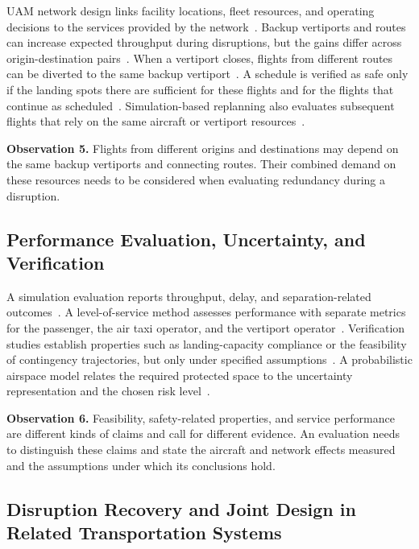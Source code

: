 \documentclass[11pt,letterpaper]{article}
\newcommand{\observation}[2]{\par\noindent\textbf{Observation #1.} #2\par}
\begin{document}
UAM network design links facility locations, fleet resources, and operating decisions to the services provided by the network~\cite{Wang2025_L087}. Backup vertiports and routes can increase expected throughput during disruptions, but the gains differ across origin-destination pairs~\cite{Wei2024_L063}. When a vertiport closes, flights from different routes can be diverted to the same backup vertiport~\cite{Wei2024_L069}. A schedule is verified as safe only if the landing spots there are sufficient for these flights and for the flights that continue as scheduled~\cite{Wei2024_L069}. Simulation-based replanning also evaluates subsequent flights that rely on the same aircraft or vertiport resources~\cite{Prince2025_L041}.

\observation{5}{Flights from different origins and destinations may depend on the same backup vertiports and connecting routes. Their combined demand on these resources needs to be considered when evaluating redundancy during a disruption.}

\subsection{Performance Evaluation, Uncertainty, and Verification}
\label{sec:literature-6}

A simulation evaluation reports throughput, delay, and separation-related outcomes~\cite{Prince2025_L041}. A level-of-service method assesses performance with separate metrics for the passenger, the air taxi operator, and the vertiport operator~\cite{Schweiger2023_L090}. Verification studies establish properties such as landing-capacity compliance or the feasibility of contingency trajectories, but only under specified assumptions~\cite{Wei2024_L069,Kim2026_L066}. A probabilistic airspace model relates the required protected space to the uncertainty representation and the chosen risk level~\cite{Hu2026_L085}.

\observation{6}{Feasibility, safety-related properties, and service performance are different kinds of claims and call for different evidence. An evaluation needs to distinguish these claims and state the aircraft and network effects measured and the assumptions under which its conclusions hold.}

\subsection{Disruption Recovery and Joint Design in Related Transportation Systems}
\label{sec:literature-7}
\end{document}
